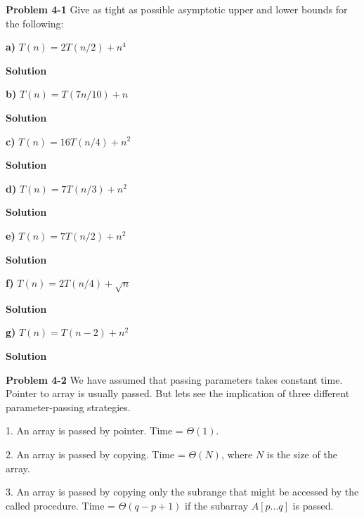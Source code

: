 \documentclass{article}
\begin{document}
\textbf{Problem 4-1} Give as tight as possible asymptotic upper and lower bounds for the following:

\medskip

\textbf{a)} $T(n) = 2T(n/2) + n^4$

\medskip

\textbf{Solution}

\medskip

\textbf{b)} $T(n) = T(7n/10) + n$

\medskip

\textbf{Solution}

\medskip

\textbf{c)} $T(n) = 16T(n/4) + n^2$

\medskip

\textbf{Solution}

\medskip

\textbf{d)} $T(n) = 7T(n/3) + n^2$

\medskip

\textbf{Solution}

\medskip

\textbf{e)} $T(n) = 7T(n/2) + n^2$

\medskip

\textbf{Solution}

\medskip

\textbf{f)} $T(n) = 2T(n/4) + \sqrt{n}$

\medskip

\textbf{Solution}

\medskip

\textbf{g)} $T(n) = T(n-2) + n^2$

\medskip

\textbf{Solution}

\hrulefill

\medskip

\textbf{Problem 4-2} We have assumed that passing parameters takes constant time. Pointer to array is usually passed. But lets see the implication of three different parameter-passing strategies.

1. An array is passed by pointer. Time = $\Theta(1)$.

2. An array is passed by copying. Time = $\Theta(N)$, where $N$ is the size of the array.

3. An array is passed by copying only the subrange that might be accessed by the called procedure. Time = $\Theta(q - p +1)$ if the subarray $A[p...q]$ is passed.

\medskip
\end{document}
